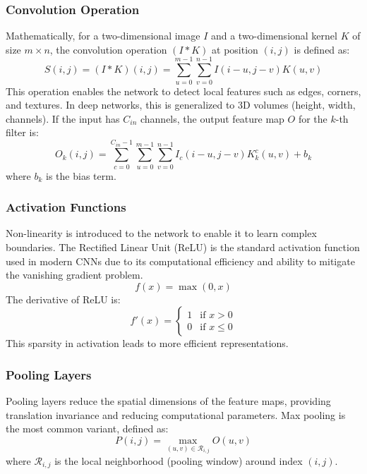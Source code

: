 \documentclass[journal]{IEEEtran}
\begin{document}
\subsubsection{Convolution Operation}
Mathematically, for a two-dimensional image $I$ and a two-dimensional kernel $K$ of size $m \times n$, the convolution operation $(I * K)$ at position $(i, j)$ is defined as:
\begin{equation}
S(i, j) = (I * K)(i, j) = \sum_{u=0}^{m-1} \sum_{v=0}^{n-1} I(i-u, j-v) K(u, v)
\end{equation}
This operation enables the network to detect local features such as edges, corners, and textures. In deep networks, this is generalized to 3D volumes (height, width, channels). If the input has $C_{in}$ channels, the output feature map $O$ for the $k$-th filter is:
\begin{equation}
O_k(i, j) = \sum_{c=0}^{C_{in}-1} \sum_{u=0}^{m-1} \sum_{v=0}^{n-1} I_c(i-u, j-v) K_k^c(u, v) + b_k
\end{equation}
where $b_k$ is the bias term.

\subsubsection{Activation Functions}
Non-linearity is introduced to the network to enable it to learn complex boundaries. The Rectified Linear Unit (ReLU) is the standard activation function used in modern CNNs due to its computational efficiency and ability to mitigate the vanishing gradient problem.
\begin{equation}
f(x) = \max(0, x)
\end{equation}
The derivative of ReLU is:
\begin{equation}
f'(x) = \begin{cases} 
1 & \text{if } x > 0 \\
0 & \text{if } x \le 0 
\end{cases}
\end{equation}
This sparsity in activation leads to more efficient representations.

\subsubsection{Pooling Layers}
Pooling layers reduce the spatial dimensions of the feature maps, providing translation invariance and reducing computational parameters. Max pooling is the most common variant, defined as:
\begin{equation}
P(i, j) = \max_{(u, v) \in \mathcal{R}_{i,j}} O(u, v)
\end{equation}
where $\mathcal{R}_{i,j}$ is the local neighborhood (pooling window) around index $(i, j)$.
\end{document}
